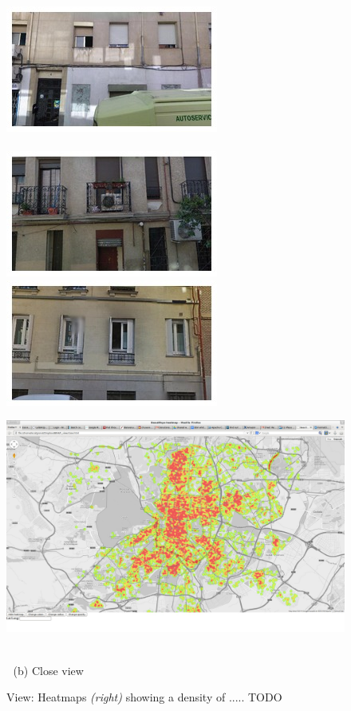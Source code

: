\begin{figure}
\begin{minipage}{\linewidth}
\begin{minipage}{0.3\linewidth}
      \includegraphics[width=0.49\linewidth]{imgs/view/mosaicsV3/mosaic0007.jpg}
      \\ \vspace{-3mm} \\
      \includegraphics[width=0.49\linewidth]{imgs/view/mosaicsV3/mosaic0008.jpg}
      \includegraphics[width=0.49\linewidth]{imgs/view/mosaicsV3/mosaic0009.jpg}
    \end{minipage}
    \begin{minipage}{0.7\linewidth}
      \includegraphics[trim= 350 150 250 150, clip=true, width=\linewidth]{imgs/view/mapV3.jpg}
    \end{minipage}
  \end{minipage}
  \\
  $\;$\hspace{30mm} (b) Close view
  \\
  \caption{
    View: Heatmaps \emph{(right)} showing a density of ..... TODO
  }
\end{figure}